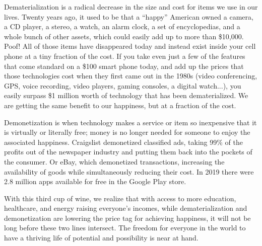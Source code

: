 {  Dematerialization is a radical decrease in the size and cost for items we use
  in our lives. Twenty years ago, it used to be that a ``happy'' American owned
  a camera, a CD player, a stereo, a watch, an alarm clock, a set of
  encyclopedias, and a whole bunch of other assets, which could easily add up to
  more than \$10,000. Poof! All of those items have disappeared today and
  instead exist inside your cell phone at a tiny fraction of the cost. If you
  take even just a few of the features that come standard on a \$100 smart phone
  today, and add up the prices that those technologies cost when they first came
  out in the 1980s (video conferencing, GPS, voice recording, video players,
  gaming consoles, a digital watch...), you easily surpass \$1 million worth of
  technology that has been dematerialized. We are getting the same benefit to
  our happiness, but at a fraction of the cost.

  \newReading Demonetization is when technology makes a service or item so
  inexpensive that it is virtually or literally free; money is no longer needed
  for someone to enjoy the associated happiness. Craigslist demonetized
  classified ads, taking 99\% of the profits out of the newspaper industry and
  putting them back into the pockets of the consumer. Or eBay, which demonetized
  transactions, increasing the availability of goods while simultaneously
  reducing their cost. In 2019 there were 2.8 million apps available for free in
  the Google Play store.

  With this third cup of wine, we realize that with access to more education,
  healthcare, and energy raising everyone's incomes, while dematerialization and
  demonetization are lowering the price tag for achieving happiness, it will not
  be long before these two lines intersect. The freedom for everyone in the
  world to have a thriving life of potential and possibility is near at hand.
}

